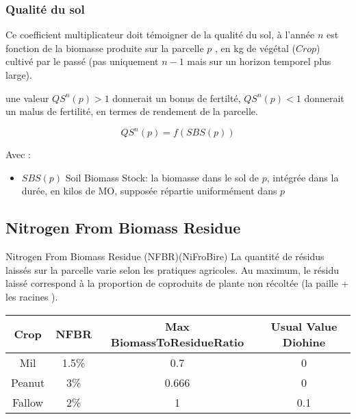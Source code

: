 \documentclass[10pt,a4paper,french]{article} %
\begin{document}
\subsubsection{Qualité du sol}

Ce coefficient multiplicateur doit témoigner de la qualité du sol, à l'année $n$ est fonction de la biomasse produite sur la parcelle $p$ , en kg de végétal ($Crop$) cultivé par le passé (pas uniquement $n-1$ mais sur un horizon temporel plus large).

une valeur $QS^n(p)>1$ donnerait un bonus de fertilté, $QS^n(p)<1$ donnerait un malus de fertilité, en termes de rendement de la parcelle.



\begin{equation}
QS^{n}(p) = f(SBS(p))
\end{equation}

Avec  :


\begin{itemize}
  \item  $SBS(p)$ Soil Biomass Stock: la biomasse dans le sol de $p$, intégrée dans la durée, en kilos de MO, supposée répartie uniformément dans $p$
\end{itemize}




\subsection{Nitrogen From Biomass Residue}


Nitrogen From Biomass Residue (NFBR)(NiFroBire)
La quantité de résidus laissés sur la parcelle varie selon les pratiques agricoles.
Au maximum, le résidu laissé correspond à la proportion de coproduits de  plante non récoltée (la paille + les racines ).



\begin{table}[h!]
\begin{tabular}{|c|c|c|c|}
\hline
\textbf{Crop}          & \textbf{NFBR}    & \textbf{Max BiomassToResidueRatio} & \textbf{Usual Value Diohine}  \\ \hline
Mil                    & 1.5\%                 & 0.7                                  &  0 \\ \hline
Peanut                 & 3\%                   & 0.666                               &  0 \\ \hline
Fallow                 & 2\%                   & 1                                   &  0.1 \\\hline
\end{tabular}
\end{table}
\end{document}
